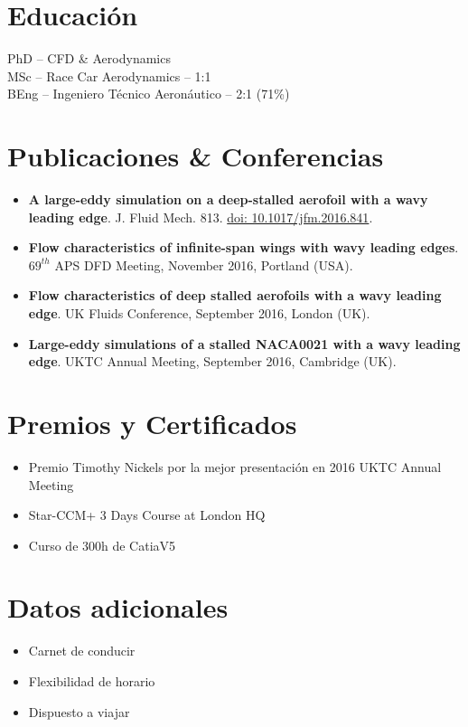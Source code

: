 \documentclass[fontsize=10pt]{tccv_esp}
\begin{document}
\section{Educaci\'on}
\begin{eventlist}
     	{\normalsize{PhD -- CFD \& Aerodynamics}} \\

\vspace{-8pt}
     	{\normalsize{MSc -- Race Car Aerodynamics -- 1:1}} \\

\vspace{-8pt}
	{\normalsize{BEng -- Ingeniero T\'ecnico Aeron\'autico -- 2:1 (71\%)}}
\end{eventlist}

\vspace{-25pt}
\section{Publicaciones \& Conferencias} 
  	\begin{itemize}
	\itemsep -2pt
\item \textbf{A large-eddy simulation on a deep-stalled aerofoil with a wavy leading edge}. J. Fluid Mech. 813. \href{https://doi.org/10.1017/jfm.2016.841}{doi: 10.1017/jfm.2016.841}.
\item \textbf{Flow characteristics of infinite-span wings with wavy leading edges}. $69^{th}$ APS DFD Meeting, November 2016, Portland (USA). 
\item \textbf{Flow characteristics of deep stalled aerofoils with a wavy
leading edge}. UK Fluids Conference, September 2016, London (UK). 
\item \textbf{Large-eddy simulations of a stalled NACA0021 with a wavy
leading edge}. UKTC Annual Meeting, September 2016, Cambridge (UK).
	\end{itemize}

\vspace{-25pt}
\section{Premios y Certificados} 
  	\begin{itemize}
	\itemsep -2pt
	\item Premio Timothy Nickels por la mejor presentaci\'on en 2016 UKTC Annual Meeting
	\item Star-CCM+ 3 Days Course at London HQ
	\item Curso de 300h de CatiaV5 
	\end{itemize}

\vspace{-22pt}
\section{Datos adicionales} 
\begin{itemize}
	\itemsep -2pt
	\item Carnet de conducir
	\item Flexibilidad de horario
	\item Dispuesto a viajar
\end{itemize}
\end{document}

